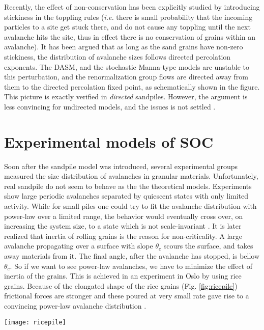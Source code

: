 \documentclass[11pt,a4paper]{book}
\begin{document}
Recently, the effect of non-conservation has been explicitly studied
\cite{mohanty1,mohanty2}
by introducing stickiness in the toppling rules (\textit{i.e.} there
is small probability that the incoming particles to a site get stuck
there, and do not cause any toppling until the next avalanche hits the
site, thus in effect there is no conservation of grains within an
avalanche). It has been argued that as long as the sand grains have
non-zero stickiness, the distribution of avalanche sizes follows directed percolation
exponents. The DASM, and the stochastic Manna-type models are
unstable to this perturbation, and the renormalization group flows are
directed away from them to the directed percolation fixed point, as
schematically shown in the figure. This picture is exactly verified in
\textit{directed} sandpiles. However, the argument is less convincing
for undirected models, and the issues is not settled \cite{bonachela2}.

\section{Experimental models of SOC}
Soon after the sandpile model was introduced, several experimental
groups measured the size distribution of avalanches in granular
materials. Unfortunately, real sandpile do not seem to behave as the
the theoretical models. Experiments show large periodic avalanches
separated by quiescent states with only limited activity. While for
small piles one could try to fit the avalanche distribution with
power-law over a limited range, the behavior would eventually cross
over, on increasing the system size, to a state which is not
scale-invariant \cite{sandexpt1,sandexpt2}. It is later realized that inertia of rolling grains
is the reason for non-criticality.
A large avalanche propagating over a surface with slope
$\theta_{c}$ scours the surface, and takes away materials from it. The
final angle, after the avalanche has stopped, is bellow
$\theta_{c}$.
So if we want to see power-law
avalanches, we have to minimize the effect of inertia of the grains. This is
achieved in an experiment in Oslo by using rice grains. Because of the
elongated shape of the rice grains (Fig. \ref{fig:ricepile})
frictional forces are stronger and these
poured at very small rate gave rise to a convincing power-law
avalanche distribution \cite{osloexpt}.
\begin{SCfigure}
\texttt{[image: ricepile]}
\caption{A schematic of a rice-pile. The elongated shapes of the rice
grains reduces the inertial effect in an avalanche. (Courtesy K.
Christensen.)}
\label{fig:ricepile}
\end{SCfigure}
\end{document}
